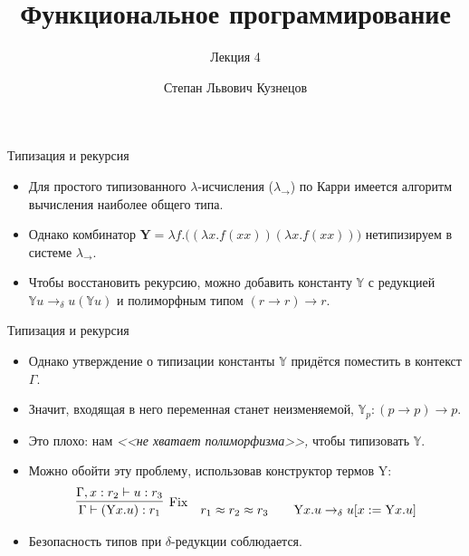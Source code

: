 \documentclass[xcolor=dvipsnames]{beamer}
\newcommand{\Yr}{\mathrm{Y}}
\newcommand{\Yx}{\mathbf{Y}}
\newcommand{\Yb}{\mathbb{Y}}
\begin{document}
\title{Функциональное программирование}
\subtitle{Лекция 4}
\date{}
\author{Степан Львович Кузнецов}

\maketitle



\begin{frame}{Типизация и рекурсия}
 
 \begin{itemize}[<+->]
  \item Для простого типизованного $\lambda$-исчисления ($\lambda_\to$) по Карри имеется алгоритм вычисления наиболее общего типа.
  \item Однако комбинатор $\Yx = \lambda f. \bigl( (\lambda x. f(xx)) (\lambda x. f(xx)) \bigr)$ нетипизируем в системе $\lambda_\to$.
  \item Чтобы восстановить рекурсию, можно добавить константу $\Yb$ с редукцией $\Yb u \to_\delta u(\Yb u)$ и полиморфным типом $(r\to r) \to r$.
 \end{itemize}

 
\end{frame}

\begin{frame}{Типизация и рекурсия}

\begin{itemize}[<+->]
 \item Однако утверждение о типизации константы $\Yb$ придётся поместить в контекст $\Gamma$.
 \item Значит, входящая в него переменная станет неизменяемой, $\Yb\!_p : (p \to p) \to p$.
 \item Это плохо: нам {\em <<не хватает полиморфизма>>,} чтобы типизовать $\Yb$.
 \item Можно обойти эту проблему, использовав конструктор термов $\Yr$:
 \[
  \infer[\mathrm{Fix}]
  {\Gamma \vdash (\Yr x. u) : r_1}
  {\Gamma, x : r_2 \vdash u : r_3}
  \quad
  r_1 \approx r_2 \approx r_3 
  \qquad
  \Yr x. u \to_\delta u[x := \Yr x.u]
 \]
 \item Безопасность типов при $\delta$-редукции соблюдается.

\end{itemize}

 
\end{frame}
\end{document}
